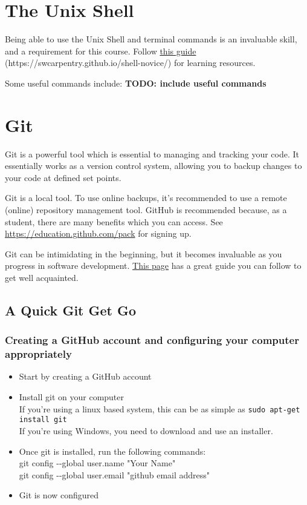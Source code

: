 \section{The Unix Shell}
\label{app:UsefulResources}
Being able to use the Unix Shell and terminal commands is an invaluable skill, and a requirement for this course. Follow \href{https://swcarpentry.github.io/shell-novice/}{this guide} (https://swcarpentry.github.io/shell-novice/) for learning resources.

Some useful commands include:
\textbf{TODO: include useful commands}

\section{Git}
\label{sec:Git}
Git is a powerful tool which is essential to managing and tracking your code. It essentially works as a version control system, allowing you to backup changes to your code at defined set points.

Git is a local tool. To use online backups, it's recommended to use a remote (online) repository management tool. GitHub is recommended because, as a student, there are many benefits which you can access. See \href{https://education.github.com/pack}{https://education.github.com/pack} for signing up.

Git can be intimidating in the beginning, but it becomes invaluable as you progress in software development. \href{https://swcarpentry.github.io/git-novice/}{This page} has a great guide you can follow to get well acquainted.

\subsection{A Quick Git Get Go}
\subsubsection{Creating a GitHub account and configuring your computer appropriately}
\begin{itemize}
    \item Start by creating a GitHub account
    \item Install git on your computer\\
    If you're using a linux based system, this can be as simple as \verb|sudo apt-get install git|\\
    If you're using Windows, you need to download and use an installer.
    \item Once git is installed, run the following commands:\\
    git config \--\--global user.name "Your Name"\\
    git config \--\--global user.email "github email address"
    \item Git is now configured
\end{itemize}

